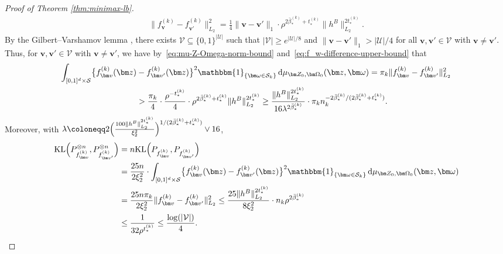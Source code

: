 \documentclass[12pt]{article}
\begin{document}
\begin{proof}[Proof of Theorem \ref{thm:minimax-lb}]
    \begin{align}
        \|f^{(k)}_{\bm v} - f^{(k)}_{\bm v'}\|_{L_2}^2 = \frac{1}{4}\|\bm v - \bm v'\|_1 \cdot \rho^{2\bar{\beta}_*^{(k)} + t_*^{(k)}} \|h^B\|_{L_2}^{2t_*^{(k)}}. \label{eq:f_w-difference-upper-bound}
    \end{align}
    By the Gilbert--Varshamov lemma \citet[][Exercise~8.9]{samworth2025statistics}, there exists $\mathcal{V} \subseteq \{0,1\}^{|\mathcal{U}|}$ such that $|\mathcal{V}| \geq e^{|\mathcal{U}|/8}$ and $\|\bm v - \bm v'\|_1 > |\mathcal{U}|/4$ for all $\bm v, \bm v' \in \mathcal{V}$ with $\bm v \neq \bm v'$. Thus, for $\bm v, \bm v' \in \mathcal{V}$ with $\bm v \neq \bm v'$, we have by~\eqref{eq:mu-Z-Omega-norm-bound} and~\eqref{eq:f_w-difference-upper-bound} that
    \begin{align}
        \int_{[0,1]^d \times \mathcal{S}}\bigl\{f^{(k)}_{\bm v}(\bm z) &- f^{(k)}_{\bm v'}(\bm z) \bigr\}^2 \mathbbm{1}_{\{\bm\omega\in\mathcal{S}_k\}} \, \mathrm{d}\mu_{\bm Z_0,\bm\Omega_0}(\bm z, \bm \omega) = \pi_k \|f^{(k)}_{\bm v} - f^{(k)}_{\bm v'}\|_{L_2}^2\nonumber\\
        &> \frac{\pi_k}{4}  \cdot \frac{\rho^{-t_*^{(k)}}}{4} \cdot \rho^{2\bar{\beta}_*^{(k)} + t_*^{(k)}} \|h^B\|_{L_2}^{2t_*^{(k)}} \geq \frac{\|h^B\|_{L_2}^{2t_*^{(k)}}}{16 \lambda^{2\bar{\beta}_*^{(k)}}} \cdot \pi_k n_k^{-2\bar{\beta}_*^{(k)} / (2\bar{\beta}_*^{(k)} + t_*^{(k)})}. \label{eq:separation-lower-bound}
    \end{align}
    Moreover, with $\lambda \coloneqq 2\Bigl(\frac{100\|h^B\|_{L_2}^{2t_*^{(k)}}}{\xi_2^2}\Bigr)^{1/(2\bar{\beta}_*^{(k)} + t_*^{(k)})} \vee 16$,
    \begin{align}
        \mathrm{KL}\Bigl(P^{\otimes n}_{f^{(k)}_{\bm v}}, P^{\otimes n}_{f^{(k)}_{\bm v'}}\Bigr) &= n\mathrm{KL}\Bigl(P_{f^{(k)}_{\bm v}}, P_{f^{(k)}_{\bm v'}}\Bigr) \nonumber \\
        &= 
        \frac{25n}{2\xi_2^2} \cdot \int_{[0,1]^d \times \mathcal{S}}\bigl\{f^{(k)}_{\bm v}(\bm z) - f^{(k)}_{\bm v'}(\bm z) \bigr\}^2 \mathbbm{1}_{\{\bm\omega\in\mathcal{S}_k\}} \, \mathrm{d}\mu_{\bm Z_0,\bm\Omega_0}(\bm z, \bm \omega) \nonumber\\
        &= \frac{25n\pi_k}{2\xi_2^2} \|f^{(k)}_{\bm v} - f^{(k)}_{\bm v'}\|_{L_2}^2 \leq \frac{25\|h^B\|_{L_2}^{2t_*^{(k)}}}{8\xi_2^2} \cdot n_k \rho^{2\bar{\beta}_*^{(k)}}  \nonumber\\
        &\leq \frac{1}{32\rho^{t_*^{(k)}}}  \leq \frac{\log(|\mathcal{V}|)}{4}. \label{eq:kl-upper-bound}
    \end{align}

\end{proof}
\end{document}
